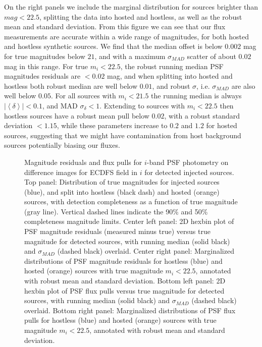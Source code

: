 On the right panels we include the marginal distribution for sources brighter than $mag < 22.5$, splitting the data into hosted and hostless, as well as the robust mean and standard deviation.
%
From this figure we can see that our \gls{flux} measurements are accurate within a wide range of magnitudes, for both hosted and hostless synthetic sources. 
We find that the median offset is below $0.002$ mag for true magnitudes below $21$, and with a maximum $\sigma_{MAD}$ scatter of about $0.02$ mag in this range.
For true $m_i < 22.5$, the robust running median PSF magnitudes residuals are $<0.02$ mag, and when splitting into hosted and hostless both robust median
are well below $0.01$, and robust $\sigma$, i.e. $\sigma_{MAD}$ are also well below $0.05$.
%
For all sources with $m_i<21.5$ the running median is always $|\left<\delta\right>| <0.1$, and MAD $\sigma_\delta < 1$. 
Extending to sources with $m_i<22.5$ then  hostless sources have  a robust mean pull below $0.02$, with a robust standard deviation $<1.15$, while these parameters increase to $0.2$ and $1.2$ for hosted sources, suggesting that we might have contamination from host background sources potentially biasing our fluxes.
%
\begin{figure}
\caption{Magnitude residuals and flux pulls for $i$-band \gls{PSF} photometry on difference images for ECDFS field in $i$ for detected injected sources.
Top panel: Distribution of true magnitudes for injected sources (blue), and split  into hostless (black dash) and hosted (orange) sources, with detection completeness as a function of true magnitude (gray line). 
Vertical dashed lines indicate the 90\% and 50\% completeness magnitude limits.
Center left panel: 2D hexbin plot of PSF magnitude residuals (measured minus true) versus true magnitude for detected sources, with running median (solid black) and $\sigma_{MAD}$ (dashed black) overlaid.
Center right panel: Marginalized distributions of PSF magnitude residuals for hostless (blue) and hosted (orange) sources with true magnitude $m_i < 22.5$, annotated with robust mean and standard deviation. 
Bottom left panel: 2D hexbin plot of PSF flux pulls versus true magnitude for detected sources, with running median (solid black) and $\sigma_{MAD}$ (dashed black) overlaid.
Bottom right panel: Marginalized distributions of PSF flux pulls for hostless (blue) and hosted (orange) sources with true magnitude $m_i < 22.5$, annotated with robust mean and standard deviation.}
\label{fig:phot_residual_diffim_fakes}
\end{figure}
%
